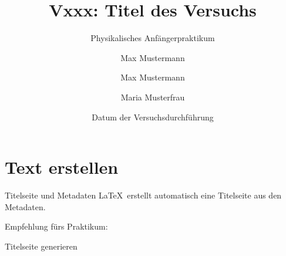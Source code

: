 \section{Text erstellen}

\begin{frame}[fragile]{Titelseite und Metadaten}
  \LaTeX\ erstellt automatisch eine Titelseite aus den Metadaten.

  \begin{block}{Empfehlung fürs Praktikum:}
    \begin{lstverbatim}
    \subject{Fakultät Physik, TU Dortmund}
    \title{Vxxx: Titel des Versuchs}
    \subtitle{Physikalisches Anfängerpraktikum}
    \author{Max Mustermann}
    \author{Max Mustermann \and Maria Musterfrau}
    \date{Datum der Versuchsdurchführung}
    \titlehead{Kopf}
    \publishers{Verlag}
    \end{lstverbatim}
  \end{block}

  \begin{block}{Titelseite generieren}
    \begin{lstverbatim}
    \maketitle
    \end{lstverbatim}
  \end{block}
\end{frame}

